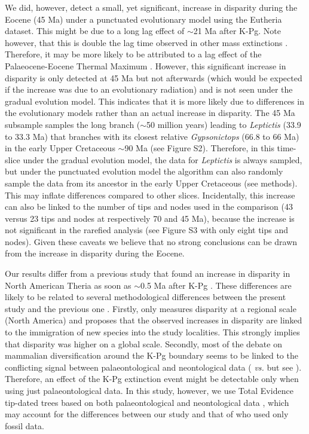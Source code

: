 \documentclass[12pt,letterpaper]{article}
\begin{document}
We did, however, detect a small, yet significant, increase in disparity during the Eocene (45 Ma) under a punctuated evolutionary model using the Eutheria dataset.
This might be due to a long lag effect of $\sim$21 Ma after K-Pg.
Note however, that this is double the lag time observed in other mass extinctions \citep{chen2012timing}.
Therefore, it may be more likely to be attributed to a lag effect of the Palaeocene-Eocene Thermal Maximum \citep[PETM; $\sim$11 Ma afterwards;][]{bininda2007delayed}.
However, this significant increase in disparity is only detected at 45 Ma but not afterwards (which would be expected if the increase was due to an evolutionary radiation) and is not seen under the gradual evolution model.
This indicates that it is more likely due to differences in the evolutionary models rather than an actual increase in disparity.
The 45 Ma subsample samples the long branch ($\sim$50 million years) leading to \textit{Leptictis} (33.9 to 33.3 Ma) that branches with its closest relative \textit{Gypsonictops} (66.8 to 66 Ma) in the early Upper Cretaceous $\sim$90 Ma (see Figure S2).
Therefore, in this time-slice under the gradual evolution model, the data for \textit{Leptictis} is always sampled, but under the punctuated evolution model the algorithm can also randomly sample the data from its ancestor in the early Upper Cretaceous (see methods).
This may inflate differences compared to other slices.
Incidentally, this increase can also be linked to the number of tips and nodes used in the comparison (43 versus 23 tips and nodes at respectively 70 and 45 Ma), because the increase is not significant in the rarefied analysis (see Figure S3 with only eight tips and nodes).
Given these caveats we believe that no strong conclusions can be drawn from the increase in disparity during the Eocene.

Our results differ from a previous study that found an increase in disparity in North American Theria as soon as $\sim$0.5 Ma after K-Pg \citep{Wilson2013}.
These differences are likely to be related to several methodological differences between the present study and the previous one \citep{Wilson2013}.
Firstly, \cite{Wilson2013} only measures disparity at a regional scale (North America) and proposes that the observed increases in disparity are linked to the immigration of new species into the study localities.
This strongly implies that disparity was higher on a global scale.
Secondly, most of the debate on mammalian diversification around the K-Pg boundary seems to be linked to the conflicting signal between palaeontological and neontological data (\citealt{meredithimpacts2011} \textit{vs.} \citealt{OLeary08022013} but see \citealt{dosReis2014}).
Therefore, an effect of the K-Pg extinction event might be detectable only when using just palaeontological data.
In this study, however, we use Total Evidence tip-dated trees based on both palaeontological and neontological data \citep{Slater2012MEE,beckancient2014}, which may account for the differences between our study and that of \cite{Wilson2013} who used only fossil data.
\end{document}
